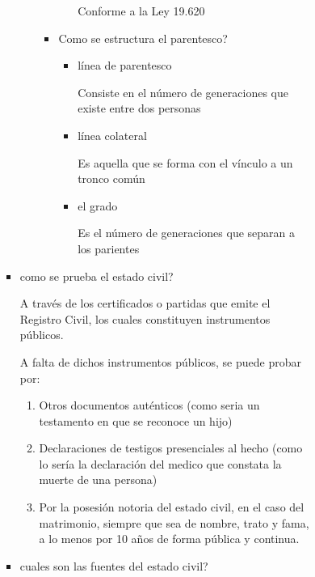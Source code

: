 \documentclass[]{article}
\providecommand{\tightlist}{%
  \setlength{\itemsep}{0pt}\setlength{\parskip}{0pt}}
\begin{document}
\begin{itemize}
\begin{itemize}
\begin{enumerate}
\begin{itemize}
\begin{enumerate}
\begin{itemize}
\begin{enumerate}
\begin{itemize}
\begin{itemize}
                  Conforme a la Ley 19.620
                \end{itemize}
              \item
                Como se estructura el parentesco?

                \begin{itemize}
                \item
                  línea de parentesco

                  Consiste en el número de generaciones que existe entre
                  dos personas
                \item
                  línea colateral

                  Es aquella que se forma con el vínculo a un tronco
                  común
                \item
                  el grado

                  Es el número de generaciones que separan a los
                  parientes
                \end{itemize}
              \end{itemize}
            \end{enumerate}
          \item
            como se prueba el estado civil?

            A través de los certificados o partidas que emite el
            Registro Civil, los cuales constituyen instrumentos
            públicos.

            A falta de dichos instrumentos públicos, se puede probar
            por:

            \begin{enumerate}
            \def\labelenumiii{\arabic{enumiii}.}
            \tightlist
            \item
              Otros documentos auténticos (como seria un testamento en
              que se reconoce un hijo)
            \item
              Declaraciones de testigos presenciales al hecho (como lo
              sería la declaración del medico que constata la muerte de
              una persona)
            \item
              Por la posesión notoria del estado civil, en el caso del
              matrimonio, siempre que sea de nombre, trato y fama, a lo
              menos por 10 años de forma pública y continua.
            \end{enumerate}
          \item
            cuales son las fuentes del estado civil?


\end{itemize}
\end{enumerate}
\end{itemize}
\end{enumerate}
\end{itemize}
\end{itemize}
\end{document}
